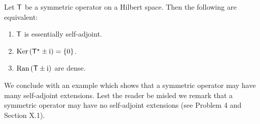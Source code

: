 \begin{corollary}
    Let $\mathsf{T}$ be a symmetric operator on a Hilbert space. Then the following are equivalent:
    \begin{enumerate}
        \item $\mathsf{T}$ is essentially self-adjoint.
        \item $\mathrm{Ker}\, (\mathsf{T}^\star \pm \mathrm{i}) = \left \lbrace 0 \right \rbrace$.
        \item $\mathrm{Ran}\,(\mathsf{T} \pm \mathrm{i})$ are dense.
    \end{enumerate}
\end{corollary}

We conclude with an example which shows that a symmetric operator may have many self-adjoint extensions. Lest the reader be misled we remark that a symmetric operator may have no self-adjoint extensions (see Problem 4 and Section X.1).

